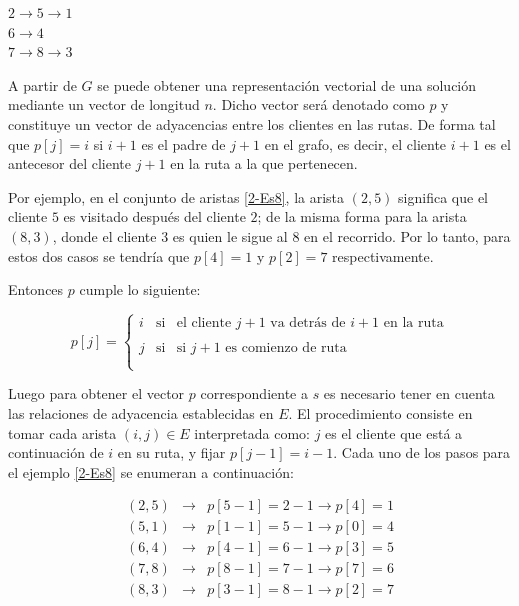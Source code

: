 \begin{center}
	$2 \rightarrow 5 \rightarrow 1$\\
	$6 \rightarrow 4$ \\
	$7 \rightarrow 8 \rightarrow 3$\\	
\end{center}

A partir de $G$ se puede obtener una representación vectorial de una solución mediante un vector de longitud $n$. Dicho vector será denotado como $p$ y constituye un vector de adyacencias entre los clientes en las rutas. De forma tal que $p[j] = i$ si $i + 1$ es el padre de $j + 1$ en el grafo, es decir, el cliente $i + 1$ es el antecesor del cliente $j + 1$ en la ruta a la que pertenecen.

Por ejemplo, en el conjunto de aristas \ref{2-Es8}, la arista $(2, 5)$ significa que el cliente $5$ es visitado después del cliente $2$; de la misma forma para la arista $(8, 3)$, donde el cliente $3$ es quien le sigue al $8$ en el recorrido. Por lo tanto, para estos dos casos se tendría que $p[4] = 1$  y $p[2] = 7$ respectivamente.

 Entonces $p$ cumple lo siguiente:

\[p[j]=\left\{
\begin{array}{rcl}
\label{2-pi}
i & \mbox{si} & \text{el cliente $j + 1$ va detrás de $i + 1$ en la ruta}\\
&
& \\
j & \mbox{si} & \text{si $j + 1$ es comienzo de ruta }  \\
&
& \\
\end{array}
\right. \]

Luego para obtener el vector $p$ correspondiente a $s$ es necesario tener en cuenta las relaciones de adyacencia establecidas en $E$. El procedimiento consiste en tomar cada arista $(i, j) \in E$ interpretada como: $j$ es el cliente que está a continuación de $i$ en su ruta, y fijar $p[j - 1] = i - 1$. Cada uno de los pasos para el ejemplo \ref{2-Es8} se enumeran a continuación:

\begin{eqnarray*}
	(2, 5) & \rightarrow & p[5 - 1] = 2 - 1  \rightarrow p[4] = 1\\
	(5, 1) & \rightarrow & p[1 - 1] = 5 - 1  \rightarrow p[0] = 4\\
	(6, 4) & \rightarrow & p[4 - 1] = 6 - 1  \rightarrow p[3] = 5\\
	(7, 8) & \rightarrow & p[8 - 1] = 7 - 1  \rightarrow p[7] = 6\\
	(8, 3) & \rightarrow & p[3 - 1] = 8 - 1  \rightarrow p[2] = 7\\
\end{eqnarray*}

